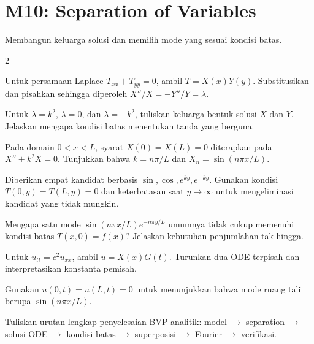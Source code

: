 \documentclass[10pt,a4paper]{article}
\newcommand{\level}[1]{\colorbox{levelbg}{\scriptsize\strut #1}}
\newcommand{\src}[1]{\colorbox{sourcebg}{\scriptsize\strut #1}}
\begin{document}
\section*{M10: Separation of Variables}
{\color{iteraGray}\small Membangun keluarga solusi dan memilih mode yang sesuai kondisi batas.}\par\vspace{1mm}
\begin{multicols}{2}
\begin{qbox}[title={M10.1: Asumsi produk\hfill \level{L2}\;\src{Var}}]
\small Untuk persamaan Laplace $T_{xx}+T_{yy}=0$, ambil $T=X(x)Y(y)$. Substitusikan dan pisahkan sehingga diperoleh $X''/X=-Y''/Y=\lambda$.
\end{qbox}
\begin{qbox}[title={M10.2: Tanda konstanta pemisah\hfill \level{L3}\;\src{Var}}]
\small Untuk $\lambda=k^2$, $\lambda=0$, dan $\lambda=-k^2$, tuliskan keluarga bentuk solusi $X$ dan $Y$. Jelaskan mengapa kondisi batas menentukan tanda yang berguna.
\end{qbox}
\begin{qbox}[title={M10.3: Boundary kiri-kanan nol\hfill \level{L3}\;\src{Var}}]
\small Pada domain $0<x<L$, syarat $X(0)=X(L)=0$ diterapkan pada $X''+k^2X=0$. Tunjukkan bahwa $k=n\pi/L$ dan $X_n=\sin(n\pi x/L)$.
\end{qbox}
\begin{qbox}[title={M10.4: Seleksi alternatif solusi\hfill \level{L3}\;\src{Var}}]
\small Diberikan empat kandidat berbasis $\sin,\cos,e^{ky},e^{-ky}$. Gunakan kondisi $T(0,y)=T(L,y)=0$ dan keterbatasan saat $y\to\infty$ untuk mengeliminasi kandidat yang tidak mungkin.
\end{qbox}
\begin{qbox}[title={M10.5: Superposisi mode\hfill \level{L3}\;\src{Var}}]
\small Mengapa satu mode $\sin(n\pi x/L)e^{-n\pi y/L}$ umumnya tidak cukup memenuhi kondisi batas $T(x,0)=f(x)$? Jelaskan kebutuhan penjumlahan tak hingga.
\end{qbox}
\begin{qbox}[title={M10.6: Separation pada wave equation\hfill \level{L3}\;\src{Var}}]
\small Untuk $u_{tt}=c^2u_{xx}$, ambil $u=X(x)G(t)$. Turunkan dua ODE terpisah dan interpretasikan konstanta pemisah.
\end{qbox}
\begin{qbox}[title={M10.7: Fixed ends\hfill \level{L3}\;\src{Var}}]
\small Gunakan $u(0,t)=u(L,t)=0$ untuk menunjukkan bahwa mode ruang tali berupa $\sin(n\pi x/L)$.
\end{qbox}
\begin{qbox}[title={M10.8: Peta proses\hfill \level{L2}\;\src{Var}}]
\small Tuliskan urutan lengkap penyelesaian BVP analitik: model $\to$ separation $\to$ solusi ODE $\to$ kondisi batas $\to$ superposisi $\to$ Fourier $\to$ verifikasi.
\end{qbox}
\end{multicols}
\newpage
\end{document}
